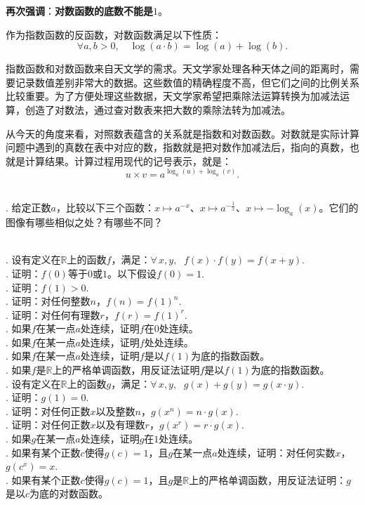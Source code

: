 \documentclass[12pt,UTF8,fontset=none]{ctexbook}
\begin{document}
\textbf{再次强调}：\textbf{对数函数的底数不能是}$1$。

作为指数函数的反函数，对数函数满足以下性质：
$$ \forall a, b > 0, \quad\log(a\cdot b) = \log(a) + \log(b). $$

指数函数和对数函数来自天文学的需求。天文学家处理各种天体之间的距离时，需要记录数值差别非常大的数据。这些数值的精确程度不高，但它们之间的比例关系比较重要。为了方便处理这些数据，天文学家希望把乘除法运算转换为加减法运算，创造了对数法，通过查对数表来把大数的乘除法转为加减法。

从今天的角度来看，对照数表蕴含的关系就是指数和对数函数。对数就是实际计算问题中遇到的真数在表中对应的数，指数就是把对数作加减法后，指向的真数，也就是计算结果。计算过程用现代的记号表示，就是：
$$ u \times v = a^{\log_a(u) + \log_a(v)}.$$

\begin{sk}
    \mbox{}\\
    . 给定正数$a$，比较以下三个函数：$x\mapsto a^{-x}$、$x\mapsto a^{-\frac{1}{x}}$、$x\mapsto -\log_a(x)$。它们的图像有哪些相似之处？有哪些不同？
\end{sk}

\begin{xt}
    \mbox{}\\
    . 设有定义在$\mathbb{R}$上的函数$f$，满足：$\forall \, x, y, \;\,\, f(x) \cdot f(y) = f(x + y).$\\
    . 证明：$f(0)$等于$0$或$1$。以下假设$f(0) = 1.$\\
    . 证明：$f(1) > 0.$\\
    . 证明：对任何整数$n$，$f(n) = f(1)^n.$\\
    . 证明：对任何有理数$r$，$f(r) = f(1)^r.$\\
    . 如果$f$在某一点$a$处连续，证明$f$在$0$处连续。\\
    . 如果$f$在某一点$a$处连续，证明$f$处处连续。\\
    . 如果$f$在某一点$a$处连续，证明$f$是以$f(1)$为底的指数函数。\\
    . 如果$f$是$\mathbb{R}$上的严格单调函数，用反证法证明$f$是以$f(1)$为底的指数函数。\\
    . 设有定义在$\mathbb{R}$上的函数$g$，满足：$\forall \, x, y, \;\,\, g(x) + g(y) = g(x \cdot y).$\\
    . 证明：$g(1) = 0.$\\
    . 证明：对任何正数$x$以及整数$n$，$g(x^n) = n\cdot g(x).$\\
    . 证明：对任何正数$x$以及有理数$r$，$g(x^r) = r\cdot g(x).$\\
    . 如果$g$在某一点$a$处连续，证明$g$在$1$处连续。\\
    . 如果有某个正数$c$使得$g(c) = 1$，且$g$在某一点$a$处连续，证明：对任何实数$x$，$g(c^x) = x.$\\
    . 如果有某个正数$c$使得$g(c) = 1$，且$g$是$\mathbb{R}$上的严格单调函数，用反证法证明：$g$是以$c$为底的对数函数。
\end{xt}
\end{document}
